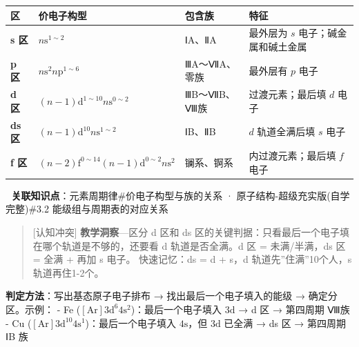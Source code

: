 {\def\LTcaptype{none} %
\begin{longtable}[]{@{}
  >{\centering\arraybackslash}p{}
  >{\raggedright\arraybackslash}p{}
  >{\raggedright\arraybackslash}p{}
  >{\raggedright\arraybackslash}p{}@{}}
\toprule\noalign{}
\begin{minipage}[b]{\linewidth}\centering
区
\end{minipage} & \begin{minipage}[b]{\linewidth}\raggedright
价电子构型
\end{minipage} & \begin{minipage}[b]{\linewidth}\raggedright
包含族
\end{minipage} & \begin{minipage}[b]{\linewidth}\raggedright
特征
\end{minipage} \\
\midrule\noalign{}
\endhead
\bottomrule\noalign{}
\endlastfoot
\textbf{s 区} & \(n\mathrm{s}^{1\sim2}\) & ⅠA、ⅡA & 最外层为 \(s\) 电子；碱金属和碱土金属 \\
\textbf{p 区} & \(n\mathrm{s}^{2}n\mathrm{p}^{1\sim6}\) & ⅢA～ⅦA、零族 & 最外层有 \(p\) 电子 \\
\textbf{d 区} & \((n-1)\mathrm{d}^{1\sim10}n\mathrm{s}^{0\sim2}\) & ⅢB～ⅦB、Ⅷ族 & 过渡元素；最后填 \(d\) 电子 \\
\textbf{ds 区} & \((n-1)\mathrm{d}^{10}n\mathrm{s}^{1\sim2}\) & ⅠB、ⅡB & \(d\) 轨道全满后填 \(s\) 电子 \\
\textbf{f 区} & \((n-2)\mathrm{f}^{0\sim14}(n-1)\mathrm{d}^{0\sim2}n\mathrm{s}^{2}\) & 镧系、锕系 & 内过渡元素；最后填 \(f\) 电子 \\
\end{longtable}
}

🔗 \textbf{关联知识点}：元素周期律\#价电子构型与族的关系 · 原子结构-超级充实版(自学完整)\#3.2 能级组与周期表的对应关系

\begin{quote}
{[}认知冲突{]} \textbf{教学洞察}---区分 d 区和 ds 区的关键判据：只看最后一个电子填在哪个轨道是不够的，还要看 d 轨道是否全满。d 区 = 未满/半满，ds 区 = 全满 + 再加 s 电子。
快速记忆：ds = d + s，d 轨道先''住满''10个人，s 轨道再住1-2个。
\end{quote}

\textbf{判定方法}：写出基态原子电子排布 → 找出最后一个电子填入的能级 → 确定分区。示例：
- Fe (\([\mathrm{Ar}] 3\mathrm{d}^6 4\mathrm{s}^2\))：最后一个电子填入 \(3\mathrm{d}\) → d 区 → 第四周期 Ⅷ族
- Cu (\([\mathrm{Ar}] 3\mathrm{d}^{10} 4\mathrm{s}^1\))：最后一个电子填入 \(4\mathrm{s}\)，但 \(3\mathrm{d}\) 已全满 → ds 区 → 第四周期 ⅠB 族

